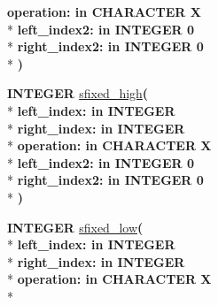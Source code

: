 \begin{DoxyCompactItemize}
{\bfseries \textcolor{vhdlchar}{operation\+: }\textcolor{stringliteral}{in }\textcolor{vhdlchar}{C\+H\+A\+R\+A\+C\+T\+E\+R   \textquotesingle{}\+X\textquotesingle{}}}\\*
{\bfseries \textcolor{vhdlchar}{left\+\_\+index2\+: }\textcolor{stringliteral}{in }\textcolor{vhdlchar}{I\+N\+T\+E\+G\+E\+R   0}}\\*
{\bfseries \textcolor{vhdlchar}{right\+\_\+index2\+: }\textcolor{stringliteral}{in }\textcolor{vhdlchar}{I\+N\+T\+E\+G\+E\+R   0}}\\*
{\bfseries  )} 
\item 
{\bfseries {\bfseries \textcolor{comment}{I\+N\+T\+E\+G\+E\+R}\textcolor{vhdlchar}{ }}} \hyperlink{classfixed__pkg_aa4fe04f18cc45d8b6513466ca7e9c319}{sfixed\+\_\+high}{\bfseries  ( }\\*
{\bfseries \textcolor{vhdlchar}{left\+\_\+index\+: }\textcolor{stringliteral}{in }{\bfseries \textcolor{comment}{I\+N\+T\+E\+G\+E\+R}\textcolor{vhdlchar}{ }}}\\*
{\bfseries \textcolor{vhdlchar}{right\+\_\+index\+: }\textcolor{stringliteral}{in }{\bfseries \textcolor{comment}{I\+N\+T\+E\+G\+E\+R}\textcolor{vhdlchar}{ }}}\\*
{\bfseries \textcolor{vhdlchar}{operation\+: }\textcolor{stringliteral}{in }\textcolor{vhdlchar}{C\+H\+A\+R\+A\+C\+T\+E\+R   \textquotesingle{}\+X\textquotesingle{}}}\\*
{\bfseries \textcolor{vhdlchar}{left\+\_\+index2\+: }\textcolor{stringliteral}{in }\textcolor{vhdlchar}{I\+N\+T\+E\+G\+E\+R   0}}\\*
{\bfseries \textcolor{vhdlchar}{right\+\_\+index2\+: }\textcolor{stringliteral}{in }\textcolor{vhdlchar}{I\+N\+T\+E\+G\+E\+R   0}}\\*
{\bfseries  )} 
\item 
{\bfseries {\bfseries \textcolor{comment}{I\+N\+T\+E\+G\+E\+R}\textcolor{vhdlchar}{ }}} \hyperlink{classfixed__pkg_acf965cb1a906fb0fdc4b9bbbfdedcc82}{sfixed\+\_\+low}{\bfseries  ( }\\*
{\bfseries \textcolor{vhdlchar}{left\+\_\+index\+: }\textcolor{stringliteral}{in }{\bfseries \textcolor{comment}{I\+N\+T\+E\+G\+E\+R}\textcolor{vhdlchar}{ }}}\\*
{\bfseries \textcolor{vhdlchar}{right\+\_\+index\+: }\textcolor{stringliteral}{in }{\bfseries \textcolor{comment}{I\+N\+T\+E\+G\+E\+R}\textcolor{vhdlchar}{ }}}\\*
{\bfseries \textcolor{vhdlchar}{operation\+: }\textcolor{stringliteral}{in }\textcolor{vhdlchar}{C\+H\+A\+R\+A\+C\+T\+E\+R   \textquotesingle{}\+X\textquotesingle{}}}\\*

\end{DoxyCompactItemize}
